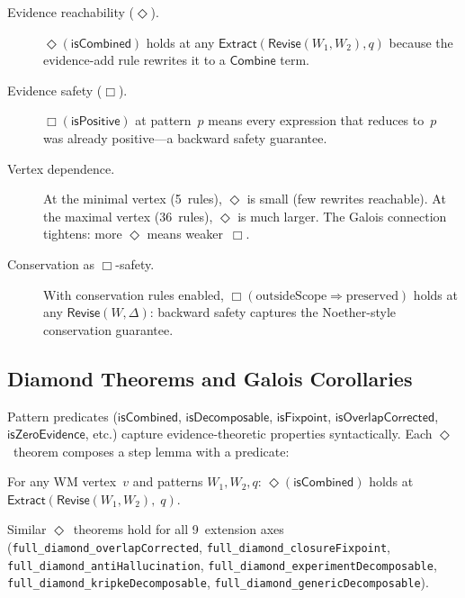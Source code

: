 \documentclass[11pt,openany]{report}
\begin{document}
\begin{description}
\item[Evidence reachability ($\Diamond$).]
  $\Diamond(\mathsf{isCombined})$ holds at any
  $\mathsf{Extract}(\mathsf{Revise}(W_1, W_2), q)$ because the
  evidence-add rule rewrites it to a $\mathsf{Combine}$ term.

\item[Evidence safety ($\Box$).]
  $\Box(\mathsf{isPositive})$ at pattern~$p$ means every expression that
  reduces to~$p$ was already positive---a backward safety guarantee.

\item[Vertex dependence.]
  At the minimal vertex (5~rules), $\Diamond$ is small (few rewrites
  reachable).  At the maximal vertex (36~rules), $\Diamond$ is much
  larger.  The Galois connection tightens:
  more $\Diamond$ means weaker~$\Box$.

\item[Conservation as $\Box$-safety.]
  With conservation rules enabled, $\Box(\text{outsideScope} \Rightarrow
  \text{preserved})$ holds at any $\mathsf{Revise}(W, \Delta)$: backward
  safety captures the Noether-style conservation guarantee.
\end{description}

\subsection{Diamond Theorems and Galois Corollaries}

Pattern predicates ($\mathsf{isCombined}$, $\mathsf{isDecomposable}$,
$\mathsf{isFixpoint}$, $\mathsf{isOverlapCorrected}$,
$\mathsf{isZeroEvidence}$, etc.) capture evidence-theoretic properties
syntactically.  Each $\Diamond$~theorem composes a step lemma with a
predicate:

\begin{theorem}
For any WM vertex~$v$ and patterns $W_1, W_2, q$:
$\Diamond(\mathsf{isCombined})$ holds at
$\mathsf{Extract}(\mathsf{Revise}(W_1, W_2),\; q)$.
\end{theorem}

\noindent
Similar $\Diamond$~theorems hold for all 9~extension axes
(\texttt{full\_diamond\_overlapCorrected},
\texttt{full\_diamond\_closureFixpoint},
\texttt{full\_diamond\_antiHallucination},
\texttt{full\_diamond\_experimentDecomposable},
\texttt{full\_diamond\_kripkeDecomposable},
\texttt{full\_diamond\_genericDecomposable}).
\end{document}
